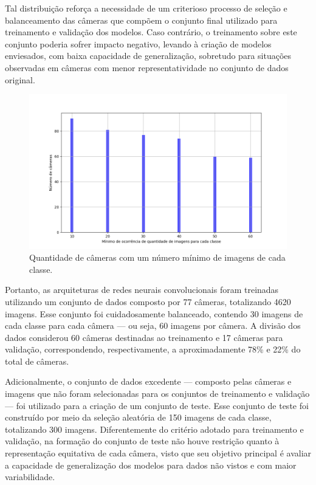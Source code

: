 Tal distribuição reforça a necessidade de um criterioso processo de seleção e balanceamento das câmeras que compõem o conjunto final utilizado para treinamento e validação dos modelos.
Caso contrário, o treinamento sobre este conjunto poderia sofrer impacto negativo, levando à criação de modelos enviesados, com baixa capacidade de generalização, sobretudo para situações observadas em câmeras com menor representatividade no conjunto de dados original.

\begin{figure}[htb]
\centerline{\includegraphics[width=1\linewidth]{images/balancedcodes.png}}
\caption{Quantidade de câmeras com um número mínimo de imagens de cada classe.}
\label{fig:balancedcodes}
\end{figure}

Portanto, as arquiteturas de redes neurais convolucionais foram treinadas utilizando um conjunto de dados composto por 77 câmeras, totalizando 4620 imagens. Esse conjunto foi cuidadosamente balanceado, contendo 30 imagens de cada classe para cada câmera — ou seja, 60 imagens por câmera. A divisão dos dados considerou 60 câmeras destinadas ao treinamento e 17 câmeras para validação, correspondendo, respectivamente, a aproximadamente 78\% e 22\% do total de câmeras.

Adicionalmente, o conjunto de dados excedente — composto pelas câmeras e imagens que não foram selecionadas para os conjuntos de treinamento e validação — foi utilizado para a criação de um conjunto de teste. Esse conjunto de teste foi construído por meio da seleção aleatória de 150 imagens de cada classe, totalizando 300 imagens. Diferentemente do critério adotado para treinamento e validação, na formação do conjunto de teste não houve restrição quanto à representação equitativa de cada câmera, visto que seu objetivo principal é avaliar a capacidade de generalização dos modelos para dados não vistos e com maior variabilidade.


